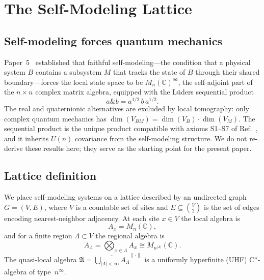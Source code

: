 \section{The Self-Modeling Lattice}
\label{sec:lattice}

\subsection{Self-modeling forces quantum mechanics}
\label{sec:paper5-summary}

Paper~5~\cite{Paper5} established that faithful self-modeling---the
condition that a physical system $B$ contains a subsystem $M$ that
tracks the state of $B$ through their shared boundary---forces the
local state space to be $M_n(\mathbb{C})^{sa}$, the self-adjoint part
of the $n \times n$ complex matrix algebra, equipped with the
L\"uders sequential product
\begin{equation}
  a \mathbin{\&} b = a^{1/2}\, b\, a^{1/2}.
  \label{eq:luders}
\end{equation}
The real and quaternionic alternatives are excluded by local
tomography: only complex quantum mechanics has
$\dim(V_{BM}) = \dim(V_B) \cdot \dim(V_M)$.  The sequential product
is the unique product compatible with axioms S1--S7 of
Ref.~\cite{vandeWetering2019}, and it inherits $U(n)$ covariance from
the self-modeling structure.  We do not re-derive these results here;
they serve as the starting point for the present paper.

\subsection{Lattice definition}
\label{sec:lattice-def}

We place self-modeling systems on a lattice described by an undirected
graph $G = (V, E)$, where $V$ is a countable set of sites and
$E \subseteq \binom{V}{2}$ is the set of edges encoding nearest-neighbor
adjacency.  At each site $x \in V$ the local algebra is
\begin{equation}
  A_x = M_n(\mathbb{C}),
  \label{eq:local-algebra}
\end{equation}
and for a finite region $\Lambda \subset V$ the regional algebra is
\begin{equation}
  A_\Lambda = \bigotimes_{x \in \Lambda} A_x \cong M_{n^{|\Lambda|}}(\mathbb{C}).
  \label{eq:regional-algebra}
\end{equation}
The quasi-local algebra
$\mathfrak{A} = \overline{\bigcup_{|\Lambda|<\infty} A_\Lambda}^{\|\cdot\|}$
is a uniformly hyperfinite (UHF) C*-algebra of type~$n^\infty$.

